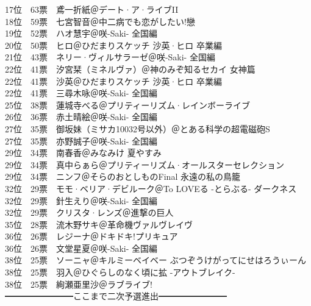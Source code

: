 {    17位　63票　鳶一折紙＠デート·ア·ライブII                               \\
    18位　59票　七宮智音＠中二病でも恋がしたい!戀                            \\
    19位　52票　ハオ慧宇＠咲-Saki- 全国編                                    \\
    20位　50票　ヒロ＠ひだまりスケッチ 沙英·ヒロ 卒業編                     \\
    21位　43票　ネリー·ヴィルサラーゼ＠咲-Saki- 全国編                      \\
    22位　41票　汐宮栞（ミネルヴァ）＠神のみぞ知るセカイ 女神篇              \\
    22位　41票　沙英＠ひだまりスケッチ 沙英·ヒロ 卒業編                     \\
    22位　41票　三尋木咏＠咲-Saki- 全国編                                    \\
    25位　38票　蓮城寺べる＠プリティーリズム·レインボーライブ               \\
    26位　36票　赤土晴絵＠咲-Saki- 全国編                                    \\
    27位　35票　御坂妹（ミサカ10032号以外）＠とある科学の超電磁砲S           \\
    27位　35票　亦野誠子＠咲-Saki- 全国編                                    \\
    29位　34票　南春香＠みなみけ 夏やすみ                                    \\
    29位　34票　真中らぁら＠プリティーリズム·オールスターセレクション       \\
    29位　34票　ニンフ＠そらのおとしものFinal 永遠の私の鳥籠                 \\
    32位　29票　モモ·ベリア·デビルーク＠To LOVEる -とらぶる- ダークネス    \\
    32位　29票　針生えり＠咲-Saki- 全国編                                    \\
    32位　29票　クリスタ·レンズ＠進撃の巨人                                 \\
    35位　28票　流木野サキ＠革命機ヴァルヴレイヴ                             \\
    36位　26票　レジーナ＠ドキドキ!プリキュア                                \\
    36位　26票　文堂星夏＠咲-Saki- 全国編                                    \\
    38位　25票　ソーニャ＠キルミーベイベー ぶつぞうけがってにせはろうぃーん  \\
    38位　25票　羽入＠ひぐらしのなく頃に拡 -アウトブレイク-                  \\
    38位　25票　絢瀬亜里沙＠ラブライブ!                                      \\
    ━━━━━━━━ここまで二次予選進出━━━━━━━━
}

